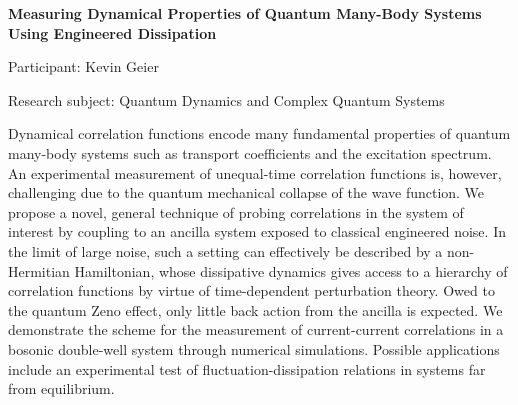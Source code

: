 \begin{minipage}[t]{1.0\textwidth}

\begin{center}

{{\large\bfseries Measuring Dynamical Properties of Quantum Many-Body Systems Using Engineered Dissipation}\par}

\end{center}

{\noindent Participant: Kevin Geier\par} 

{\noindent Research subject: Quantum Dynamics and Complex Quantum Systems\par}\medskip

\noindent Dynamical correlation functions encode many fundamental properties of quantum many-body systems such as transport coefficients and the excitation spectrum. An experimental measurement of unequal-time correlation functions is, however, challenging due to the quantum mechanical collapse of the wave function. We propose a novel, general technique of probing correlations in the system of interest by coupling to an ancilla system exposed to classical engineered noise. In the limit of large noise, such a setting can effectively be described by a non-Hermitian Hamiltonian, whose dissipative dynamics gives access to a hierarchy of correlation functions by virtue of time-dependent perturbation theory. Owed to the quantum Zeno effect, only little back action from the ancilla is expected. We demonstrate the scheme for the measurement of current-current correlations in a bosonic double-well system through numerical simulations. Possible applications include an experimental test of fluctuation-dissipation relations in systems far from equilibrium.\par\end{minipage}

\hfill 

